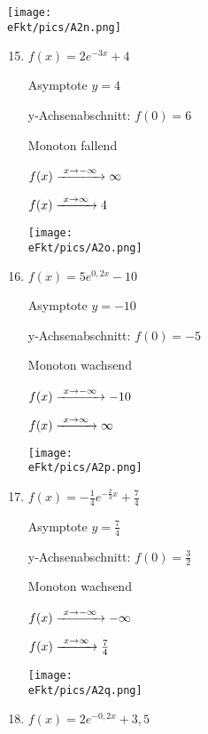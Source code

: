 \begin{Answer}[ref=eFktA2]
\begin{minipage}{\textwidth}
\begin{minipage}{0.5\textwidth}
\begin{enumerate}[label=\alph*)]
				\texttt{[image: \\eFkt/pics/A2n.png]}
			\end{enumerate}
		\end{minipage}%
		\begin{minipage}{0.5\textwidth}
			\begin{enumerate}[label=\alph*)]
				\setcounter{enumi}{14}
				\item \(f(x)=2e^{-3x}+4\)

				Asymptote \(y=4\)

				y-Achsenabschnitt: \(f(0)=6\)

				Monoton fallend

				\(f(x)\xrightarrow{\hphantom{\ }x\to-\infty\hphantom{\ }}\infty\)

				\(f(x)\xrightarrow{\hphantom{\ }x\to\infty\hphantom{\ }}4\)

				\texttt{[image: \\eFkt/pics/A2o.png]}
				\item \(f(x)=5e^{0,2x}-10\)

				Asymptote \(y=-10\)

				y-Achsenabschnitt: \(f(0)=-5\)

				Monoton wachsend

				\(f(x)\xrightarrow{\hphantom{\ }x\to-\infty\hphantom{\ }}-10\)

				\(f(x)\xrightarrow{\hphantom{\ }x\to\infty\hphantom{\ }}\infty\)

				\texttt{[image: \\eFkt/pics/A2p.png]}
			\end{enumerate}
		\end{minipage}%
	\end{minipage}
	\newpage
	\begin{minipage}{\textwidth}
		\begin{minipage}{0.5\textwidth}
			\begin{enumerate}[label=\alph*)]
				\setcounter{enumi}{16}
				\item \(f(x)=-\frac{1}{4}e^{-\frac{2}{3}x}+\frac{7}{4}\)

				Asymptote \(y=\frac{7}{4}\)

				y-Achsenabschnitt: \(f(0)=\frac{3}{2}\)

				Monoton wachsend

				\(f(x)\xrightarrow{\hphantom{\ }x\to-\infty\hphantom{\ }}-\infty\)

				\(f(x)\xrightarrow{\hphantom{\ }x\to\infty\hphantom{\ }}\frac{7}{4}\)

				\texttt{[image: \\eFkt/pics/A2q.png]}
				\item \(f(x)=2e^{-0,2x}+3,5\)


\end{enumerate}
\end{minipage}
\end{minipage}
\end{Answer}
